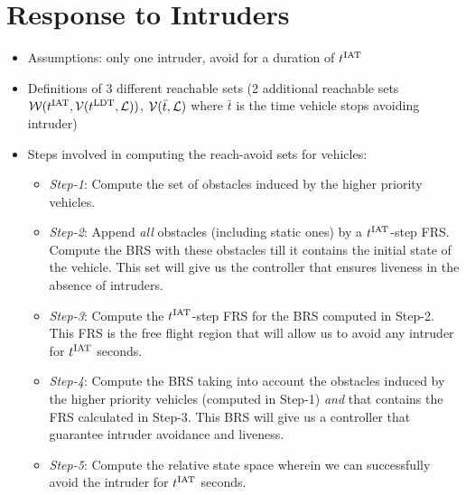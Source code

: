 \section{Response to Intruders \label{sec:HJIVI}}
\begin{itemize}
\item Assumptions: only one intruder, avoid for a duration of $t^\text{IAT}$
\item Definitions of 3 different reachable sets (2 additional reachable sets $\mathcal{W}(t^\text{IAT}, \mathcal{V}(t^\text{LDT}, \mathcal{L}))$, $\mathcal{V}(\bar t, \mathcal{L})$ where $\bar t$ is the time vehicle stops avoiding intruder)
\item Steps involved in computing the reach-avoid sets for vehicles:
\begin{itemize}
\item \textit{Step-1}: Compute the set of obstacles induced by the higher priority vehicles. 
\item \textit{Step-2}: Append \textit{all} obstacles (including static ones) by a $t^\text{IAT}$-step FRS. Compute the BRS with these obstacles till it contains the initial state of the vehicle. This set will give us the controller that ensures liveness in the absence of intruders. 
\item \textit{Step-3}: Compute the $t^\text{IAT}$-step FRS for the BRS computed in Step-2. This FRS is the free flight region that will allow us to avoid any intruder for $t^\text{IAT}$ seconds. 
\item \textit{Step-4}: Compute the BRS taking into account the obstacles induced by the higher priority vehicles (computed in Step-1) \textit{and} that contains the FRS calculated in Step-3. This BRS will give us a controller that guarantee intruder avoidance and liveness. 
\item \textit{Step-5}: Compute the relative state space wherein we can successfully avoid the intruder for $t^\text{IAT}$ seconds. 
\end{itemize}
\end{itemize}

